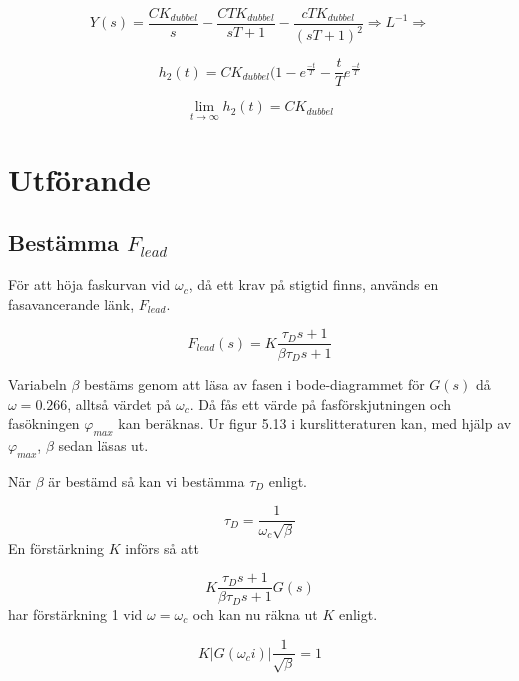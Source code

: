 \documentclass[a4paper]{article}
\begin{document}
\begin{equation*}
  Y(s)=\frac{CK_{dubbel}}{s}-\frac{CTK_{dubbel}}{sT+1}-\frac{cTK_{dubbel}}{(sT+1)^2} \Rightarrow L^{-1} \Rightarrow
\end{equation*}

\begin{equation}
  h_{2}(t)=CK_{dubbel}(1-e^{\frac{-t}{T}}-\frac{t}{T}e^{\frac{-t}{T}}
\end{equation}

\begin{equation}
  \lim_{t \to \infty} h_{2}(t)=CK_{dubbel}
\end{equation}


\section{Utförande}



\subsection{Bestämma $F_{lead}$}

För att höja faskurvan vid $\omega_{c}$, då ett krav på stigtid finns, används en fasavancerande länk, $F_{lead}$.

\begin{equation}
  F_{lead}(s)=K\frac{\tau_{D}s+1}{\beta\tau_{D}s+1}
\end{equation}

Variabeln $\beta$ bestäms genom att läsa av fasen i bode-diagrammet för $G(s)$ då $\omega = 0.266$, alltså värdet på $\omega_c$.
Då fås ett värde på fasförskjutningen och fasökningen $\varphi_{max}$ kan beräknas.
Ur figur 5.13 i kurslitteraturen \cite{kb} kan, med hjälp av $\varphi_{max}$, $\beta$ sedan läsas ut.

När $\beta$ är bestämd så kan vi bestämma $\tau_D$ enligt.

\begin{equation}
  \tau_D=\frac{1}{\omega_c\sqrt{\beta}}
\end{equation}
En förstärkning $K$ införs så att 

\begin{equation}
  K\frac{\tau_Ds+1}{\beta\tau_Ds+1}G(s)
\end{equation}
har förstärkning 1 vid $\omega = \omega_c$ och kan nu räkna ut $K$ enligt.

\begin{equation}
  K|G(\omega_ci)|\frac{1}{\sqrt{\beta}}=1
\end{equation}
\end{document}

